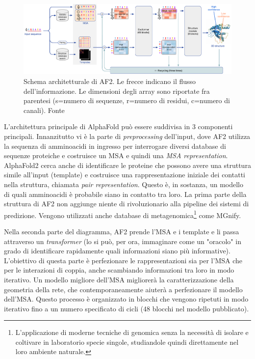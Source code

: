 \begin{figure}[!htb]
	\centering
	\includegraphics[scale=0.38]{images/af-archit.png}
	\caption{Schema architetturale di AF2. Le frecce indicano il flusso dell'informazione. Le dimensioni degli array sono riportate fra parentesi (s=numero di sequenze, r=numero di residui, c=numero di canali). Fonte\cite{jumper2021highly}}
	\label{fig:architettura-af2}
\end{figure}

L'architettura principale di AlphaFold può essere suddivisa in 3 componenti principali. Innanzitutto vi è la parte di \textit{preprocessing} dell'input, dove AF2 utilizza la sequenza di amminoacidi in ingresso per interrogare diversi database di sequenze proteiche e costruisce un MSA e quindi una \textit{MSA representation}. AlphaFold2 cerca anche di identificare le proteine che possono avere una struttura simile all'input (template) e costruisce una rappresentazione iniziale dei contatti nella struttura, chiamata \textit{pair representation}. Questo è, in sostanza, un modello di quali amminoacidi è probabile siano in contatto tra loro. La prima parte della struttura di AF2 non aggiunge niente di rivoluzionario alla pipeline dei sistemi di predizione. Vengono utilizzati anche database di metagenomica\footnote{L'applicazione di moderne tecniche di genomica senza la necessità di isolare e coltivare in laboratorio specie singole, studiandole quindi direttamente nel loro ambiente naturale.} come MGnify.

\par Nella seconda parte del diagramma, AF2 prende l'MSA e i template e li passa attraverso un \textit{transformer} (lo si può, per ora, immaginare come un "oracolo" in grado di identificare rapidamente quali informazioni siano più informative). L'obiettivo di questa parte è perfezionare le rappresentazioni sia per l'MSA che per le interazioni di coppia, anche scambiando informazioni tra loro in modo iterativo. Un modello migliore dell'MSA migliorerà la caratterizzazione della geometria della rete, che contemporaneamente aiuterà a perfezionare il modello dell'MSA. Questo processo è organizzato in blocchi che vengono ripetuti in modo iterativo fino a un numero specificato di cicli (48 blocchi nel modello pubblicato).

